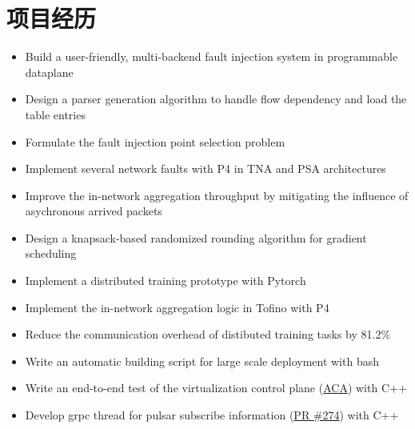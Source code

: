 \documentclass{resume}
\begin{document}
\section{项目经历}

\begin{itemize}
  \item Build a user-friendly, multi-backend fault injection system in programmable dataplane
  \item Design a parser generation algorithm to handle flow dependency and load the table entries
  \item Formulate the fault injection point selection problem
  \item Implement several network faults with P4 in TNA and PSA architectures
\end{itemize}

\begin{itemize}
  \item Improve the in-network aggregation throughput by mitigating the influence of asychronous arrived packets
  \item Design a knapsack-based randomized rounding algorithm for gradient scheduling
  \item Implement a distributed training prototype with Pytorch 
  \item Implement the in-network aggregation logic in Tofino with P4
  \item Reduce the communication overhead of distibuted training tasks by 81.2\%
\end{itemize}

\begin{itemize}
  \item Write an automatic building script for large scale deployment with bash
  \item Write an end-to-end test of the virtualization control plane (\href{https://github.com/futurewei-cloud/alcor-control-agent}{ACA}) with C++
  \item Develop grpc thread for pulsar subscribe information (\href{https://github.com/futurewei-cloud/alcor-control-agent/pull/274}{PR \#274}) with C++
\end{itemize}
\end{document}
